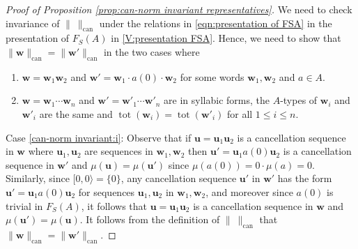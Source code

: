 \documentclass[12pt]{amsart}
\theoremstyle{definition}
\newcommand{\B}[1]{\mathbf{#1}}
\newcommand{\OP}[1]{\operatorname{#1}}
\def\can{\text{can}}
\def\Free{F}
\newcommand{\myinterval}[1]{[ #1 \rangle}
\begin{document}
\begin{proof}[Proof of Proposition \ref{prop:can-norm invariant representatives}]
We need to check invariance of $\| \ \|_{\can}$ under the relations in \eqref{eqn:presentation of FSA} in the presentation of $\Free_S(A)$ in \ref{V:presentation FSA}.
Hence, we need to show that $\| \B w\|_{\can}=\| \B w'\|_{\can}$  in  the two cases where
\begin{enumerate}[label=(\roman*)]
\item\label{can-norm invariant:i}
$\B w = \B w_1 \B w_2$ and $\B w' = \B w_1 \cdot a(0) \cdot \B w_2$ for some words $\B w_1, \B w_2$ and $a \in A$.

\item\label{can-norm invariant:ii}
$\B w = \B w_1 \cdots \B w_n$ and $\B w' = \B w'_1 \cdots \B w'_n$ are in syllabic forms, the $A$-types of $\B w_i$ and $\B w'_i$ are the same and $\OP{tot}(\B w_i)=\OP{tot}(\B w'_i)$ for all $1 \leq i \leq n$.
\end{enumerate}
Case \ref{can-norm invariant:i}:
Observe that if $\B u = \B u_1 \B u_2$ is a cancellation sequence in $\B w$ where $\B u_1, \B u_2$ are sequences in $\B w_1,\B w_2$ then $\B u'=\B u_1 a(0) \B u_2$ is a cancellation sequence in $\B w'$ and $\mu(\B u)=\mu(\B u')$ since $\mu(a(0))=0 \cdot \mu(a)=0$.
Similarly, since $\myinterval{0,0}=\{0\}$, any cancellation sequence $\B u'$ in $\B w'$ has the form $\B u'=\B u_1 a(0) \B u_2$ for sequences $\B u_1, \B u_2$ in $\B w_1, \B w_2$, and moreover since $a(0)$ is trivial in $\Free_S(A)$, it follows that $\B u = \B u_1 \B u_2$ is a cancellation sequence in $\B w$ and $\mu(\B u')=\mu(\B u)$.
It follows from the definition of $\| \ \|_{\can}$ that $\|\B w\|_{\can} = \| \B w'\|_{\can}$.


\end{proof}
\end{document}
